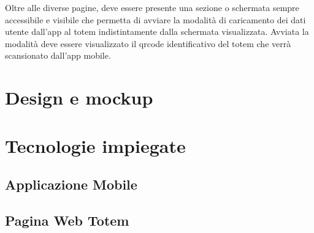 Oltre alle diverse pagine, deve essere presente una sezione o schermata sempre accessibile e visibile che permetta di avviare la modalità di caricamento dei dati utente dall'app al totem indistintamente dalla schermata visualizzata. Avviata la modalità deve essere visualizzato il qrcode identificativo del totem che verrà scansionato dall'app mobile.

\section{Design e mockup}
\section{Tecnologie impiegate}
\subsection{Applicazione Mobile}
\subsection{Pagina Web Totem}